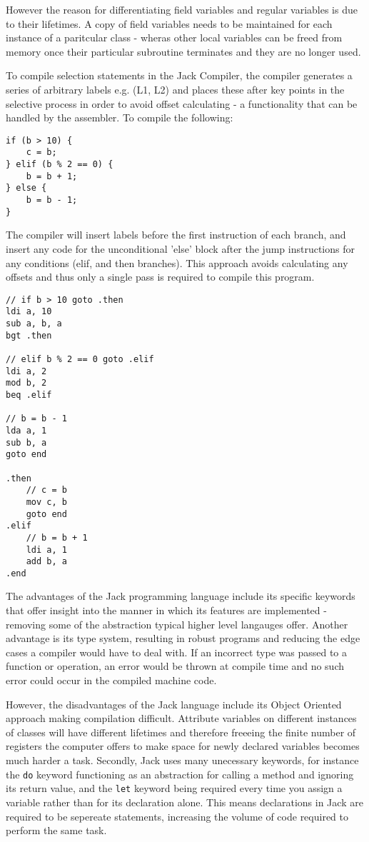 However the reason for differentiating field variables and regular variables is due to their lifetimes. A copy of field variables needs to be maintained for each instance of a paritcular class - wheras other local variables can be freed from memory once their particular subroutine terminates and they are no longer used.

To compile selection statements in the Jack Compiler, the compiler generates a series of arbitrary labels e.g. (L1, L2) and places these after key points in the selective process in order to avoid offset calculating - a functionality that can be handled by the assembler. To compile the following:
\begin{lstlisting}
if (b > 10) {
    c = b;
} elif (b % 2 == 0) {
    b = b + 1; 
} else {
    b = b - 1;
}
\end{lstlisting}

The compiler will insert labels before the first instruction of each branch, and insert any code for the unconditional 'else' block after the jump instructions for any conditions (elif, and then branches). This approach avoids calculating any offsets and thus only a single pass is required to compile this program.

\begin{lstlisting}
// if b > 10 goto .then
ldi a, 10
sub a, b, a 
bgt .then

// elif b % 2 == 0 goto .elif
ldi a, 2
mod b, 2
beq .elif

// b = b - 1
lda a, 1
sub b, a
goto end

.then
    // c = b
    mov c, b
    goto end
.elif
    // b = b + 1
    ldi a, 1
    add b, a
.end
\end{lstlisting}

The advantages of the Jack programming language include its specific keywords that offer insight into the manner in which its features are implemented - removing some of the abstraction typical higher level langauges offer. Another advantage is its type system, resulting in robust programs and reducing the edge cases a compiler would have to deal with. If an incorrect type was passed to a function or operation, an error would be thrown at compile time and no such error could occur in the compiled machine code.

However, the disadvantages of the Jack language include its Object Oriented approach making compilation difficult. Attribute variables on different instances of classes will have different  lifetimes and therefore freeeing the finite number of registers the computer offers to make space for newly declared variables becomes much harder a task. Secondly, Jack uses many unecessary keywords, for instance the \texttt{do} keyword functioning as an abstraction for calling a method and ignoring its return value, and the \texttt{let} keyword being required every time you assign a variable rather than for its declaration alone. This means declarations in Jack are required to be sepereate statements, increasing the volume of code required to perform the same task.


